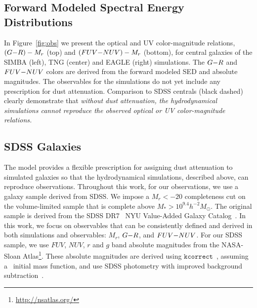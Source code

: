\subsection{Forward Modeled Spectral Energy Distributions} \label{sec:fm} 

In Figure~\ref{fig:obs} we present the optical and UV color-magnitude
relations, $(G{-}R)-M_r$ (top) and $(FUV{-}NUV)-M_r$ (bottom), for central galaxies
of the SIMBA (left), TNG (center) and EAGLE (right) simulations. The $G{-}R$ and
$FUV{-}NUV$ colors are derived from the forward modeled SED and absolute magnitudes.
The observables for the simulations do not yet include any prescription for dust
attenuation. Comparison to SDSS centrals (black dashed) clearly demonstrate
that {\em without dust attenuation, the hydrodynamical simulations cannot
reproduce the observed optical or UV color-magnitude relations.}

\subsection{SDSS Galaxies} \label{sec:obs} 
The \eda model provides a flexible prescription for assigning dust attenuation
to simulated galaxies so that the hydrodynamical simulations, described above,
can reproduce observations. Throughout this work, for our observations, we use
a galaxy sample derived from SDSS.  %
We impose a $M_r < -20$ completeness cut on the \cite{tinker2011} volume-limited 
sample that is complete above $M_* > 10^{9.4} h^{-2}M_\odot$. The original
\cite{tinker2011} sample is derived from the SDSS DR7~\citep{abazajian2009} NYU
Value-Added Galaxy Catalog~\citep[VAGC;][]{blanton2005}. In this work, we focus 
on observables that can be consistently defined and derived in both simulations 
and observables: $M_r$, $G{-}R$, and $FUV{-}NUV$. For our SDSS sample, we use $FUV$,
$NUV$, $r$ and $g$ band absolute magnitudes from the NASA-Sloan
Atlas\footnote{\url{http://nsatlas.org/}}. These absolute magnitudes are
derived using $\mathtt{kcorrect}$~\citep{blanton2007a}, assuming
a~\cite{chabrier2003} initial mass function, and use SDSS photometry with
improved background subtraction~\citep{blanton2011}. 

